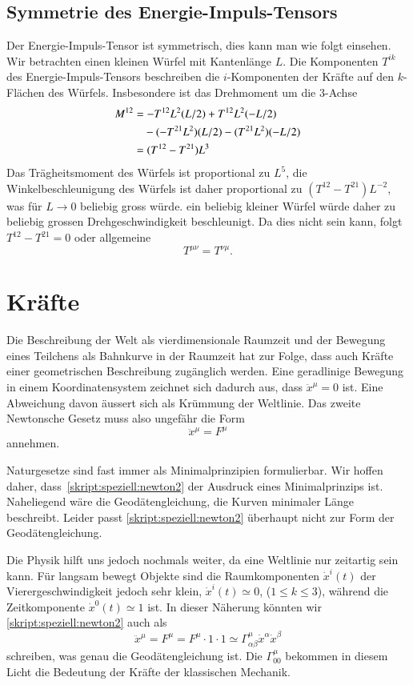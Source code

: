 \subsection{Symmetrie des Energie-Impuls-Tensors}
Der Energie-Impuls-Tensor ist symmetrisch, dies kann man wie folgt einsehen.
Wir betrachten einen kleinen Würfel mit Kantenlänge $L$.
Die Komponenten $T^{ik}$ des Energie-Impuls-Tensors beschreiben die
$i$-Komponenten der Kräfte auf den $k$-Flächen des Würfels.
Insbesondere ist das Drehmoment um die $3$-Achse
\begin{align*}
M^{12}
&=
-T^{12}L^2(L/2) + T^{12}L^2 (-L/2)
\\
&\phantom{\mathstrut=}-(-T^{21}L^2)(L/2)-(T^{21}L^2)(-L/2)
\\
&=(T^{12}-T^{21})L^3
\end{align*}
Das Trägheitsmoment des Würfels ist proportional zu $L^5$,
die Winkelbeschleunigung des Würfels ist daher proportional
zu $(T^{12}-T^{21})L^{-2}$, was für $L\to 0$ beliebig gross würde.
ein beliebig kleiner Würfel würde daher zu beliebig grossen 
Drehgeschwindigkeit beschleunigt.
Da dies nicht sein kann, folgt $T^{12}-T^{21}=0$ oder allgemeine
\[
T^{\mu\nu}=T^{\nu\mu}.
\]

\section{Kräfte}
Die Beschreibung der Welt als vierdimensionale Raumzeit und der Bewegung
eines Teilchens als Bahnkurve in der Raumzeit hat zur Folge, dass auch
Kräfte einer geometrischen Beschreibung zugänglich werden.
Eine geradlinige Bewegung in einem Koordinatensystem zeichnet sich
dadurch aus, dass $\ddot x^\mu=0$ ist.
Eine Abweichung davon äussert sich als Krümmung der Weltlinie.
Das zweite Newtonsche Gesetz muss also ungefähr die Form
\begin{equation}
\ddot x^\mu = F^\mu
\label{skript:speziell:newton2}
\end{equation}
annehmen.

Naturgesetze sind fast immer als Minimalprinzipien formulierbar.
Wir hoffen daher, dass~\eqref{skript:speziell:newton2} der Ausdruck
eines Minimalprinzips ist.
Naheliegend wäre die Geodätengleichung, die Kurven minimaler Länge 
beschreibt.
Leider passt \eqref{skript:speziell:newton2}
überhaupt nicht zur Form der Geodätengleichung.

Die Physik hilft uns jedoch nochmals weiter, da
eine Weltlinie nur zeitartig sein kann.
Für langsam bewegt Objekte sind die Raumkomponenten $\dot x^i(t)$
der Vierergeschwindigkeit jedoch sehr klein, $\dot x^i(t)\simeq 0$,
($1\le k\le 3$), während
die Zeitkomponente $\dot x^0(t)\simeq 1$ ist.
In dieser Näherung könnten wir \eqref{skript:speziell:newton2}
auch als
\begin{equation}
\ddot x^\mu
=
F^\mu
=
F^\mu\cdot 1 \cdot 1
\simeq
\Gamma^\mu_{\alpha\beta}\dot x^\alpha\dot x^\beta
\end{equation}
schreiben, was genau die Geodätengleichung ist.
Die $\Gamma^\mu_{00}$ bekommen in diesem Licht die Bedeutung der 
Kräfte der klassischen Mechanik.

